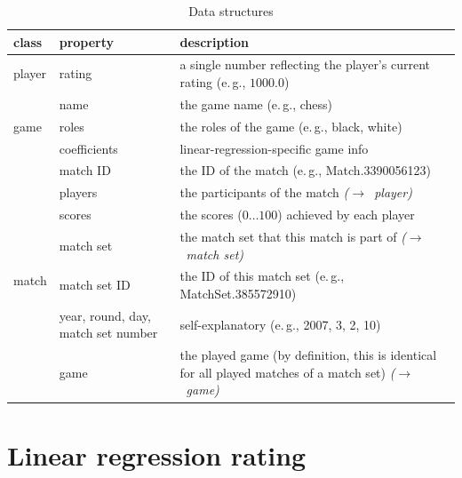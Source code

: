 \documentclass[a4paper,10pt]{article}
\begin{document}
\begin{table}
\begin{center}
\begin{tabular}{l m{2.8cm} >{\raggedright\arraybackslash}m{6cm}}
\hline
\textbf{class} & \textbf{property} & \textbf{description} \\
\hline
player & rating & a single number reflecting the player's current rating (e.\,g., $1000.0$) \\
\hline
\multirow{3}{*}{game} & name & the game name (e.\,g., chess) \\
 & roles & the roles of the game (e.\,g., black, white) \\
 & coefficients &  linear-regression-specific game info \\
\hline
\multirow{7}{*}{match} & match ID & the ID of the match (e.\,g., Match.3390056123) \\
 & players & the participants of the match \textit{($\rightarrow$~player)} \\ 
 & scores & the scores ($0 \dotsc 100$) achieved by each player\\ 
 & match set & the match set that this match is part of \textit{($\rightarrow$~match set)} \\ 
\hline
\multirow{6}{*}{match set} & match set ID & the ID of this match set (e.\,g., MatchSet.385572910) \\
 & year, round, day, match set number & self-explanatory (e.\,g., 2007, 3, 2, 10) \\
 & game & the played game (by definition, this is identical for all played matches of a match set) \textit{($\rightarrow$~game)} \\
\hline
\end{tabular}
\end{center}
\caption{Data structures}
\label{tab:data_structures}
\end{table} 

\section{Linear regression rating}
\end{document}
